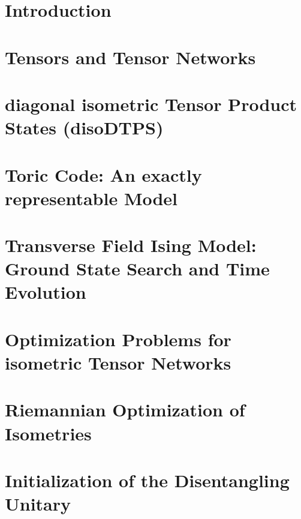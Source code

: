 \documentclass[encoding=utf8,british]{template/thesis}
\begin{document}
	\chapter{Introduction}
	
	\chapter{Tensors and Tensor Networks}
	
	
	\chapter{diagonal isometric Tensor Product States (disoDTPS)}
	
	
	\chapter{Toric Code: An exactly representable Model}
	
	
	\chapter{Transverse Field Ising Model: Ground State Search and Time Evolution}
	
	
	\appendix
	
	\chapter{Optimization Problems for isometric Tensor Networks}
	\label{app:optimization_problems_for_isometric_tensor_networks}
	
	
	\chapter{Riemannian Optimization of Isometries}
	\label{app:riemannian_optimization_of_isometries}
	
	
	\chapter{Initialization of the Disentangling Unitary}
	
	\backmatter
	\printbibliography
	
\end{document}
